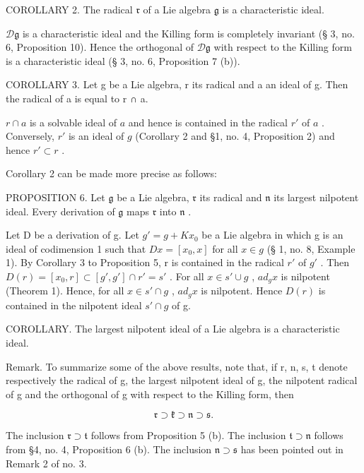 COROLLARY 2. The radical \(\mathfrak{r}\) of a Lie algebra \(\mathfrak{g}\) is a characteristic ideal.

\(\mathcal{D}\mathfrak{g}\) is a characteristic ideal and the Killing form is completely invariant (§ 3, no. 6, Proposition 10). Hence the orthogonal of \(\mathcal{D}\mathfrak{g}\) with respect to the Killing form is a characteristic ideal (§ 3, no. 6, Proposition 7 (b)).

COROLLARY 3. Let g be a Lie algebra, r its radical and a an ideal of g. Then the radical of a is equal to r ∩ a.

\(r \cap a\) is a solvable ideal of \(a\) and hence is contained in the radical \(r'\) of \(a\) . Conversely, \(r'\) is an ideal of \(g\) (Corollary 2 and §1, no. 4, Proposition 2) and hence \(r' \subset r\) .

Corollary 2 can be made more precise as follows:

PROPOSITION 6. Let \(\mathfrak{g}\) be a Lie algebra, \(\mathfrak{r}\) its radical and \(\mathfrak{n}\) its largest nilpotent ideal. Every derivation of \(\mathfrak{g}\) maps \(\mathfrak{r}\) into \(\mathfrak{n}\) .

Let D be a derivation of g. Let \(g' = g + Kx_0\) be a Lie algebra in which g is an ideal of codimension 1 such that \(Dx = [x_0, x]\) for all \(x \in g\) (§ 1, no. 8, Example 1). By Corollary 3 to Proposition 5, r is contained in the radical \(r'\) of \(g'\) . Then \(D(r) = [x_0, r] \subset [g', g'] \cap r' = s'\) . For all \(x \in s' \cup g\) , \(ad_g x\) is nilpotent (Theorem 1). Hence, for all \(x \in s' \cap g\) , \(ad_g x\) is nilpotent. Hence \(D(r)\) is contained in the nilpotent ideal \(s' \cap g\) of g.

COROLLARY. The largest nilpotent ideal of a Lie algebra is a characteristic ideal.

Remark. To summarize some of the above results, note that, if r, n, s, t denote respectively the radical of g, the largest nilpotent ideal of g, the nilpotent radical of g and the orthogonal of g with respect to the Killing form, then

\[
\mathfrak {r} \supset \mathfrak {k} \supset \mathfrak {n} \supset \mathfrak {s}.
\]

The inclusion \(\mathfrak{r} \supset \mathfrak{t}\) follows from Proposition 5 (b). The inclusion \(\mathfrak{t} \supset \mathfrak{n}\) follows from §4, no. 4, Proposition 6 (b). The inclusion \(\mathfrak{n} \supset \mathfrak{s}\) has been pointed out in Remark 2 of no. 3.

